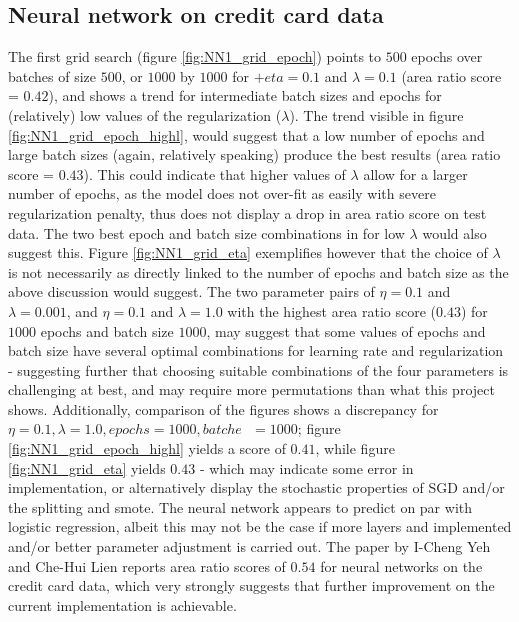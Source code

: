 \documentclass[%
oneside,                 %
final,                   %
10pt]{article}
\begin{document}
\subsection{Neural network on credit card data}
The first grid search (figure \ref{fig:NN1_grid_epoch}) points to $500$ epochs over batches of size $500$, or $1000$ by $1000$ for $+eta=0.1$ and $\lambda=0.1$ (area ratio score = $0.42$), and shows a trend for intermediate batch sizes and epochs for (relatively) low values of the regularization ($\lambda$). The trend visible in  figure \ref{fig:NN1_grid_epoch_highl}, would suggest that a low number of epochs and large batch sizes (again, relatively speaking) produce the best results (area ratio score = $0.43$). This could indicate that higher values of $\lambda$ allow for a larger number of epochs, as the model does not over-fit as easily with severe regularization penalty, thus does not display a drop in area ratio score on test data. The two best epoch and batch size combinations in for low $\lambda$ would also suggest this. Figure \ref{fig:NN1_grid_eta} exemplifies however that the choice of $\lambda$ is not necessarily as directly linked to the number of epochs and batch size as the above discussion would suggest. The two parameter pairs of $\eta=0.1$ and $\lambda=0.001$, and $\eta=0.1$ and $\lambda=1.0$ with the highest area ratio score ($0.43$) for $1000$ epochs and batch size $1000$, may suggest that some values of epochs and batch size have several optimal combinations for learning rate and regularization - suggesting further that choosing suitable combinations of the four parameters is challenging at best, and may require more permutations than what this project shows. Additionally, comparison of the figures shows a discrepancy for $\eta=0.1,\lambda=1.0,epochs=1000,batche \textit{ }=1000$; figure \ref{fig:NN1_grid_epoch_highl} yields a score of $0.41$, while  figure \ref{fig:NN1_grid_eta} yields $0.43$ - which may indicate some error in implementation, or alternatively display the stochastic properties of SGD and/or the splitting and smote. The neural network appears to predict on par with logistic regression, albeit this may not be the case if more layers and implemented and/or better parameter adjustment is carried out. The paper by  I-Cheng Yeh and Che-Hui Lien \cite{YCCC} reports area ratio scores of $0.54$ for neural networks on the credit card data, which very strongly suggests that further improvement on the current implementation is achievable.
\end{document}
